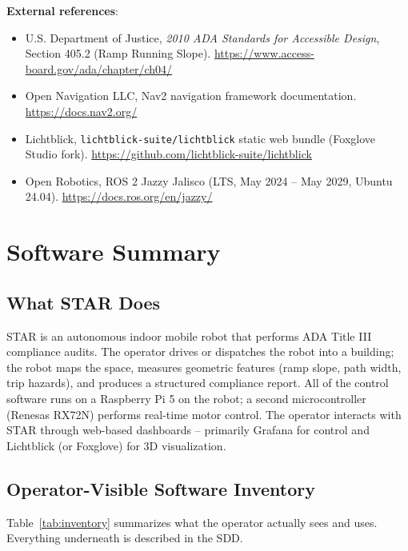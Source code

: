 \documentclass[11pt,letterpaper]{article}
\begin{document}
\textbf{External references}:
\begin{itemize}[leftmargin=1.4em,itemsep=2pt]
\item U.S. Department of Justice, \textit{2010 ADA Standards for
      Accessible Design}, Section 405.2 (Ramp Running Slope).
      \url{https://www.access-board.gov/ada/chapter/ch04/}
\item Open Navigation LLC, Nav2 navigation framework documentation.
      \url{https://docs.nav2.org/}
\item Lichtblick, \texttt{lichtblick-suite/lichtblick} static web
      bundle (Foxglove Studio fork).
      \url{https://github.com/lichtblick-suite/lichtblick}
\item Open Robotics, ROS 2 Jazzy Jalisco (LTS, May 2024 -- May
      2029, Ubuntu 24.04). \url{https://docs.ros.org/en/jazzy/}
\end{itemize}

\section{Software Summary}
\label{sec:summary}

\subsection{What STAR Does}
STAR is an autonomous indoor mobile robot that performs ADA Title III
compliance audits. The operator drives or dispatches the robot into a
building; the robot maps the space, measures geometric features (ramp
slope, path width, trip hazards), and produces a structured compliance
report. All of the control software runs on a Raspberry Pi 5 on the
robot; a second microcontroller (Renesas RX72N) performs real-time
motor control. The operator interacts with STAR through web-based
dashboards -- primarily Grafana for control and Lichtblick (or
Foxglove) for 3D visualization.

\subsection{Operator-Visible Software Inventory}
Table~\ref{tab:inventory} summarizes what the operator actually sees
and uses. Everything underneath is described in the SDD.
\end{document}

